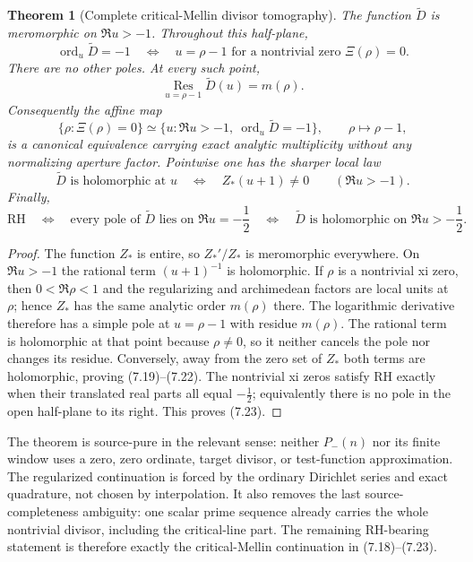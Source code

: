 \documentclass[11pt]{article}
\newtheorem{theorem}{Theorem}[section]
\newcommand{\XiR}{\Xi}
\newcommand{\ord}{\operatorname{ord}}
\begin{document}
\begin{theorem}[Complete critical-Mellin divisor tomography]
\label{thm:critical-mellin-divisor-tomography}
The function $\widetilde D$ is meromorphic on $\Re u>-1$.  Throughout this half-plane,
\[
 \ord_u\widetilde D=-1
 \quad\Longleftrightarrow\quad
 u=\rho-1
 \text{ for a nontrivial zero }\XiR(\rho)=0.
 \tag{7.19}
\]
There are no other poles.  At every such point,
\[
 \operatorname*{Res}_{u=\rho-1}\widetilde D(u)=m(\rho).
 \tag{7.20}
\]
Consequently the affine map
\[
 \{\rho:\XiR(\rho)=0\}
 \simeq
 \{u:\Re u>-1,\ \ord_u\widetilde D=-1\},
 \qquad \rho\longmapsto\rho-1,
 \tag{7.21}
\]
is a canonical equivalence carrying exact analytic multiplicity without any normalizing aperture
factor.  Pointwise one has the sharper local law
\[
 \widetilde D\text{ is holomorphic at }u
 \quad\Longleftrightarrow\quad
 Z_*(u+1)\ne0
 \qquad(\Re u>-1).
 \tag{7.22}
\]
Finally,
\[
 \boxed{
 \mathrm{RH}
 \quad\Longleftrightarrow\quad
 \text{every pole of }\widetilde D\text{ lies on }\Re u=-\frac12
 \quad\Longleftrightarrow\quad
 \widetilde D\text{ is holomorphic on }\Re u>-\frac12.}
 \tag{7.23}
\]
\end{theorem}

\begin{proof}
The function $Z_*$ is entire, so $Z_*'/Z_*$ is meromorphic everywhere.  On $\Re u>-1$ the
rational term $(u+1)^{-1}$ is holomorphic.  If $\rho$ is a nontrivial xi zero, then
$0<\Re\rho<1$ and the regularizing and archimedean factors are local units at $\rho$; hence
$Z_*$ has the same analytic order $m(\rho)$ there.  The logarithmic derivative therefore has a
simple pole at $u=\rho-1$ with residue $m(\rho)$.  The rational term is holomorphic at that point
because $\rho\ne0$, so it neither cancels the pole nor changes its residue.  Conversely, away
from the zero set of $Z_*$ both terms are holomorphic, proving \textup{(7.19)}--\textup{(7.22)}.
The nontrivial xi zeros satisfy RH exactly when their translated real parts all equal
$-\frac12$; equivalently there is no pole in the open half-plane to its right.  This proves
\textup{(7.23)}.
\end{proof}

The theorem is source-pure in the relevant sense: neither $P_-(n)$ nor its finite window uses a
zero, zero ordinate, target divisor, or test-function approximation.  The regularized
continuation is forced by the ordinary Dirichlet series and exact quadrature, not chosen by
interpolation.  It also removes the last source-completeness ambiguity: one scalar prime sequence
already carries the whole nontrivial divisor, including the critical-line part.  The remaining
RH-bearing statement is therefore exactly the critical-Mellin continuation in
\textup{(7.18)}--\textup{(7.23)}.
\end{document}
